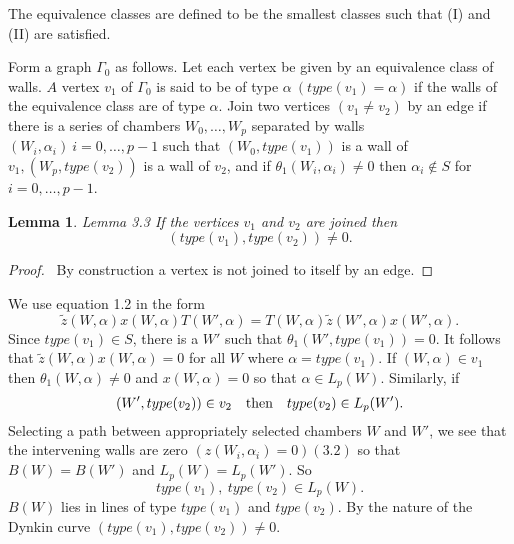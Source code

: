 \documentclass{memo-l}
\newtheorem{lemma}[theorem]{Lemma}
\theoremstyle{definition}
\theoremstyle{remark}
\numberwithin{section}{chapter}
\numberwithin{equation}{chapter}
\begin{document}
\noindent
The equivalence classes are defined to be the smallest classes such that
(I) and (II) are satisfied.

   Form a graph ${\Gamma}_{0}$ as follows.  Let each vertex be given by an
equivalence class of walls.  $A$ vertex $v_{1}$ of ${\Gamma}_{0}$ is said
to be of type ${\alpha} \ (type(v_{1})={\alpha})$ if the walls of the
equivalence class are of type ${\alpha}$.  Join two vertices $(v_{1}\ne
v_{2})$ by an edge if there is a series of chambers $W_{0},\ldots ,W_{p}$
separated by walls $(W_{i},{\alpha}_{i}) \ i = 0,\ldots ,p-1$ such that
$(W_{0},type(v_{1}))$ is a wall of $v_{1}, (W_{p},type(v_{2}))$ is a wall
of $v_{2}$, and if ${\theta}_{1}(W_{i},{\alpha}_{i})\ne 0$ then
${\alpha}_{i} {\notin} S$ for $i = 0,\ldots ,p-1$.

\medskip

\begin{lemma}{Lemma 3.3} If the vertices $v_{1}$ and $v_{2}$ are joined
then $$(type(v_{1}),type(v_{2}))\ne 0.$$
\end{lemma}

\medpagebreak

\begin{proof} \ By construction a vertex is not joined to itself by an
edge.
\end{proof}

\medpagebreak

   We use equation 1.2 in the form
$$
\tilde {z} (W,{\alpha})x(W,{\alpha})T(W',{\alpha}) = T(W,{\alpha})\tilde z
(W',{\alpha})x(W',{\alpha}).
$$
Since $type(v_{1})  \in  S$, there is a $W'$ such that
${\theta}_{1}(W',type(v_{1}))=0$.  It follows that $\tilde z(W,{\alpha})x(W,{\alpha})=0$
for all $W$ where ${\alpha} = type(v_{1})$.  If
$(W,{\alpha})  \in  v_{1}$ then ${\theta}_{1}(W,{\alpha})\ne 0$ and
$x(W,{\alpha}) = 0$ so that ${\alpha}  \in  L_{p}(W)$.  Similarly, if
$$(W',type(v_{2}))  \in  v_{2} \quad \hbox{then}\quad  type(v_{2})  \in  L_{p}(W').$$
Selecting a path between appropriately selected chambers $W$ and $W'$, we
see that the intervening walls are zero $(z(W_{i},{\alpha}_{i}) = 0) (3.2)$
so that $B(W) = B(W')$ and $L_{p}(W) = L_{p}(W')$.  So $$type(v_{1}),\
type(v_{2})  \in  L_{p}(W).$$  $B(W)$ lies in lines of type $type(v_{1})$
and $type(v_{2})$.  By the nature of the Dynkin curve
$(type(v_{1}),type(v_{2})) \ne 0$.

{\medskip}
\end{document}
